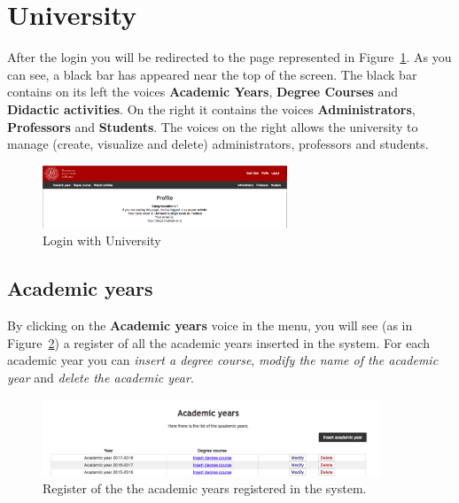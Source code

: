 \section{University}
\Warning{}

After the login you will be redirected to the page represented in Figure~\ref{fig:loggedProfile}. As you can see, a black bar has appeared near the top of the screen.
The black bar contains on its left the voices \textbf{Academic Years}, \textbf{Degree Courses} and \textbf{Didactic activities}. On the right it contains the voices \textbf{Administrators}, \textbf{Professors} and \textbf{Students}.
The voices on the right allows the university to manage (create, visualize and delete) administrators, professors and students.

\begin{figure}[!h]
\centering
\includegraphics[width=0.65\textwidth]{img/loggedProfile.png}
\caption{Login with University}
\label{fig:loggedProfile}
\end{figure}

\subsection{Academic years}
By clicking on the \textbf{Academic years} voice in the menu, you will see (as in Figure~\ref{fig:acadYear}) a register of all the academic years inserted in the system. For each academic year you can \emph{insert a degree course}, \emph{modify the name of the academic year} and \emph{delete the academic year}.

\begin{figure}[!h]
  \centering
  \includegraphics[width=0.90\textwidth]{img/accademicYears.png}
  \caption{Register of the the academic years registered in the system.}
  \label{fig:acadYear}
\end{figure}

